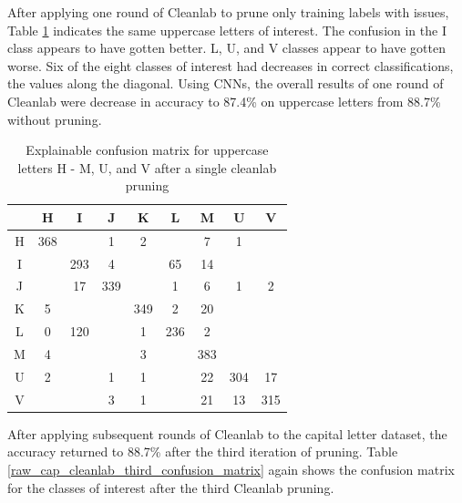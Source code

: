 \documentclass[conference]{IEEEtran}
\begin{document}
After applying one round of Cleanlab to prune only training labels with issues,
Table \ref{raw_cap_cleanlab_confusion_matrix} indicates the same uppercase
letters of interest. The confusion in the I class appears to have gotten better.
L, U, and V classes appear to have gotten worse. Six of the eight classes of
interest had decreases in correct classifications, the values along the
diagonal.  Using CNNs, the overall results of one round of Cleanlab were
decrease in accuracy to 87.4\% on uppercase letters from 88.7\% without pruning.

\begin{table}
    \centering
    \begin{tabular}{ |c|c|c|c|c|c|c|c|c|}
    \hline
    ~ & H & I & J & K & L & M & U & V \\
    \hline
    H & 368 & & 1 & 2 & & 7 & 1 & \\
    \hline
    I &  & 293 & 4 &  & 65 & 14 & & \\
    \hline
    J & & 17 & 339 & & 1 & 6 & 1 & 2 \\
    \hline
    K & 5 &  &  & 349 & 2 & 20 &  & \\
    \hline
    L & 0 & 120 &  & 1 & 236 & 2 & & \\
    \hline
    M & 4 & & & 3 & & 383 & & \\
    \hline
    U & 2 & & 1 & 1 & & 22 & 304 & 17 \\
    \hline
    V & & & 3 & 1 & & 21 & 13 & 315 \\
    \hline
    \end{tabular}
    \caption{\label{raw_cap_cleanlab_confusion_matrix}Explainable confusion matrix for
    uppercase letters H - M, U, and V after a single cleanlab pruning}
\end{table}

After applying subsequent rounds of Cleanlab to the capital letter dataset, the
accuracy returned to 88.7\% after the third iteration of pruning. Table
\ref{raw_cap_cleanlab_third_confusion_matrix} again shows the confusion matrix
for the classes of interest after the third Cleanlab pruning.
\end{document}
